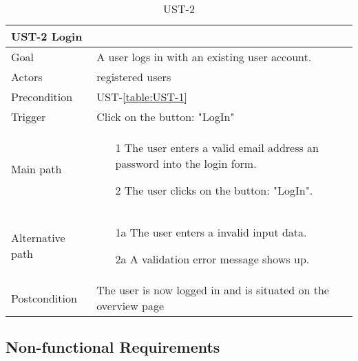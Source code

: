 \documentclass[titlepage, 12pt]{article}
\begin{document}
\begin{table}[H]
  \begin{center}

    \begin{tabular}{p{4cm}|p{10cm}}
      \textbf{UST-2 Login}                                                              \\
      \hline
      Goal             & A user logs in with an existing user account.                  \\
      \hline
      Actors           & registered users                                               \\
      \hline
      Precondition     & UST-\ref{table:UST-1}                                          \\
      \hline
      Trigger          & Click on the button: "LogIn"                                   \\
      \hline
      Main path        &
      \begin{itemize}
        \item [1] The user enters a valid email address an password into the login form.
        \item [2] The user clicks on the button: "LogIn".
      \end{itemize}                                                         \\
      \hline
      Alternative path &
      \begin{itemize}
        \item [1a] The user enters a invalid input data.
        \item [2a] A validation error message shows up.
      \end{itemize}                                                         \\
      \hline
      Postcondition    & The user is now logged in and is situated on the overview page \\
    \end{tabular}

    \caption{UST-2}
    \label{table:UST-2}

  \end{center}
\end{table}



\subsection{Non-functional Requirements}
\end{document}
